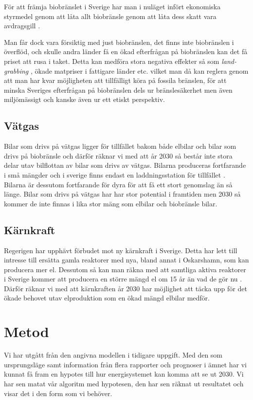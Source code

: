 \documentclass[a4paper,11pt,fleqn, titlepage]{article}
\begin{document}
För att främja biobränslet i Sverige har man i nuläget infört ekonomiska styrmedel
genom att låta allt biobränsle genom att låta dess skatt vara
avdragsgill \cite{ekonomiskastyrmedel}.

Man får dock vara försiktig med just biobränslen, det finns inte
biobränslen i överflöd, och skulle andra länder få en ökad efterfrågan på
biobränslen kan det få priset att rusa i taket. Detta kan medföra stora
negativa effekter så som \emph{land-grabbing} \cite{bioenergi}, ökade matpriser i
fattigare länder etc. vilket man då kan reglera genom att man har kvar
möjligheten att tillfälligt köra på fossila bränslen, för att minska
Sveriges efterfrågan på biobränslen dels ur bränslesäkerhet men även
miljömässigt och kanske även ur ett etiskt perspektiv.

\subsection{Vätgas}
Bilar som drivs på vätgas ligger för tillfället bakom både elbilar och
bilar som drivs på biobränsle och därför räknar vi med att år 2030 så
består inte stora delar utav bilflottan av bilar som drivs av vätgas.
Bilarna produceras fortfarande i små mängder och i sverige finns endast en
laddningsstation för tillfället \cite{macken}.
Bilarna är dessutom fortfarande för dyra för att få ett stort genomslag än så länge. Bilar som drivs på vätgas har har stor potential i framtiden men 2030 så kommer de inte finnas i lika stor mäng som elbilar och biobränsle bilar.

\subsection{Kärnkraft}
Regerigen har upphävt förbudet mot ny kärnkraft i Sverige. Detta har lett till intresse till ersätta gamla reaktorer med nya, bland annat i Oskarshamn, som kan producera mer el.
Dessutom så kan man räkna med att samtliga aktiva reaktorer i Sverige
kommer att producera en större mängd el om 15 år än vad de gör nu
\cite[s.~80]{karnkraft}. Därför räknar vi med att kärnkraften år 2030 har möjlighet att täcka upp för det ökade behovet utav elproduktion som en ökad mängd elbilar medför.

\section{Metod}
Vi har utgått från den angivna modellen i tidigare uppgift. Med den som
ursprungsläge samt information från flera rapporter och prognoser i ämnet
har vi kunnat få fram en hypotes till hur energisystemet kan komma att se
ut 2030. Vi har sen matat vår algoritm med hypotesen, den har sen räknat ut
resultatet och visar det i den form som vi behöver.
\end{document}
